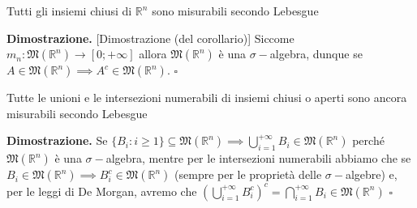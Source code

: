 \begin{cor}
	Tutti gli insiemi chiusi di $\mathbb{R}^n$ sono misurabili secondo Lebesgue
\end{cor}
%
\noindent \textbf{Dimostrazione. }[Dimostrazione (del corollario)]
	Siccome $m_n: \mathfrak{M}(\mathbb{R}^n) \to [0; +\infty]$ allora $\mathfrak{M}(\mathbb{R}^n)$ è una $\sigma-$algebra, dunque se $A \in \mathfrak{M}(\mathbb{R}^n) \implies A^c \in \mathfrak{M}(\mathbb{R}^n)$.
\hfill $\square$
%
\vspace{0.5cm}
\begin{cor}
	Tutte le unioni e le intersezioni numerabili di insiemi chiusi o aperti sono ancora misurabili secondo Lebesgue
\end{cor}
%
\noindent \textbf{Dimostrazione. }
	Se $\{ B_i : i \geq 1 \} \subseteq \mathfrak{M}(\mathbb{R}^n) \implies \bigcup\limits_{i=1}^{+\infty} B_i \in \mathfrak{M}(\mathbb{R}^n)$ perché $\mathfrak{M}(\mathbb{R}^n)$ è una $\sigma-$algebra, mentre per le intersezioni numerabili abbiamo che se $B_i \in \mathfrak{M}(\mathbb{R}^n) \implies B_i^c \in \mathfrak{M}(\mathbb{R}^n)$ (sempre per le proprietà delle $\sigma-$algebre)
	e, per le leggi di De Morgan, avremo che $\left(\bigcup\limits_{i=1}^{+\infty} B_i^c \right)^c = \bigcap\limits_{i=1}^{+\infty} B_i \in \mathfrak{M}(\mathbb{R}^n)$
\hfill $\square$
%
\vspace{0.5cm}
